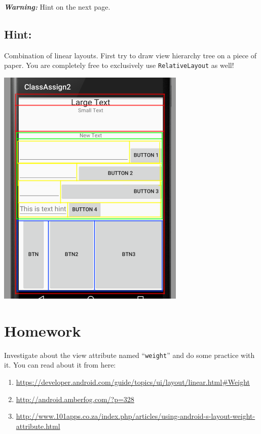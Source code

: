 \textit{\textbf{Warning:}} Hint on the next page.

\newpage
\subsection{Hint:}
Combination of linear layouts. First try to draw view hierarchy tree on a piece of paper. You are completely free to exclusively use \texttt{RelativeLayout} as well!

\begin{center}
	\includegraphics[scale=0.45]{chapters/ch03/images/29}
\end{center}

\section{Homework}
Investigate about the view attribute named ``\texttt{weight}'' and do some practice with it. You can read about it from here:

\begin{enumerate}
	\item \url{https://developer.android.com/guide/topics/ui/layout/linear.html#Weight}
	
	\item \url{http://android.amberfog.com/?p=328}
	
	\item \url{http://www.101apps.co.za/index.php/articles/using-android-s-layout-weight-attribute.html}
\end{enumerate}